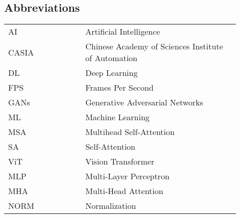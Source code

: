 \begin{center}
    \section*{Abbreviations}
    \begin{table}[h]
        \centering
        \renewcommand{\arraystretch}{1.5}
        \begin{tabular}{@{}p{0.3\linewidth}p{0.6\linewidth}@{}}
            AI    & Artificial Intelligence                             \\
            CASIA & Chinese Academy of Sciences Institute of Automation \\
            DL    & Deep Learning                                       \\
            FPS   & Frames Per Second                                   \\
            GANs  & Generative Adversarial Networks                     \\
            ML    & Machine Learning                                    \\
            MSA   & Multihead Self-Attention                            \\
            SA    & Self-Attention                                      \\
            ViT   & Vision Transformer                                  \\
            MLP   & Multi-Layer Perceptron                             \\
            MHA   & Multi-Head Attention                                \\
            NORM  & Normalization                                       \\
        \end{tabular}
    \end{table}
\end{center}
